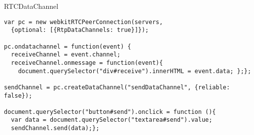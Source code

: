 \begin{frame}[containsverbatim]{RTCDataChannel}
\begin{lstlisting}
var pc = new webkitRTCPeerConnection(servers,
  {optional: [{RtpDataChannels: true}]});

pc.ondatachannel = function(event) {
  receiveChannel = event.channel;
  receiveChannel.onmessage = function(event){
    document.querySelector("div#receive").innerHTML = event.data; };};

sendChannel = pc.createDataChannel("sendDataChannel", {reliable: false});

document.querySelector("button#send").onclick = function (){
  var data = document.querySelector("textarea#send").value;
  sendChannel.send(data);};
\end{lstlisting}
\end{frame}